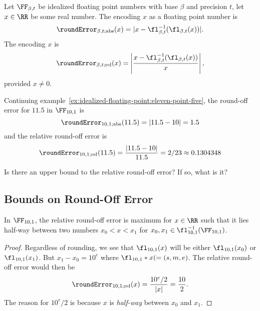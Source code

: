 \begin{defn}\label{defn:round-off-error}
Let $\FF_{\beta,t}$ be idealized floating point numbers with base
$\beta$ and precision $t$, let $x\in\RR$ be some real number. The
 encoding $x$ as a floating point number is
\begin{equation}
\roundError_{\beta,t;\text{abs}}(x) = |x - \fl_{\beta,t}^{-1}(\fl_{\beta,t}(x))|.
\end{equation}
The  encoding $x$ is
\begin{equation}
\roundError_{\beta,t;\text{rel}}(x) = \left|\frac{x - \fl_{\beta,t}^{-1}(\fl_{\beta,t}(x))}{x}\right|,
\end{equation}
provided $x\neq0$.
\end{defn}

\begin{ex}
  Continuing
  example~\ref{ex:idealized-floating-point:eleven-point-five},
  the round-off error for $11.5$ in $\FF_{10,1}$ is
  \begin{equation}
    \roundError_{10,1;\text{abs}}(11.5) = |11.5 - 10| = 1.5
  \end{equation}
  and the relative round-off error is
  \begin{equation}
    \roundError_{10,1;\text{rel}}(11.5) = \frac{|11.5 - 10|}{11.5} = 2/23\approx 0.1304348
  \end{equation}
\end{ex}

\begin{puzzle}
Is there an upper bound to the relative round-off error? If so, what is it?
\end{puzzle}

\subsection{Bounds on Round-Off Error}


\begin{lemma}
In $\FF_{10,1}$, the relative round-off error is maximum for $x\in\RR$
such that it lies half-way between two numbers $x_{0}<x<x_{1}$ for
$x_{0},x_{1}\in\fl_{10,1}^{-1}(\FF_{10,1})$.
\end{lemma}
\begin{proof}
Regardless of rounding, we see that $\fl_{10,1}(x)$ will be either
$\fl_{10,1}(x_{0})$ or $\fl_{10,1}(x_{1})$. But $x_{1}-x_{0}=10^{e}$
where $\fl_{10,1}*x(=(s,m,e)$.
The relative round-off error would then be
\begin{equation}
  \roundError_{10,1;\text{rel}}(x) = \frac{10^{e}/2}{|x|} = \frac{10}{2}.
\end{equation}
The reason for $10^{e}/2$ is because $x$ is \emph{half-way} between
$x_{0}$ and $x_{1}$.
\end{proof}

